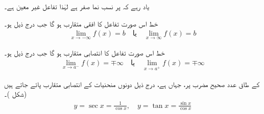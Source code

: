 یاد رہے کہ  پر نسب نما صفر ہے لہٰذا تفاعل غیر معین ہے۔

خط  اس صورت تفاعل  کا  افقی متقارب ہو گا جب  درج ذیل ہو۔
\begin{align*}
 \lim_{x\to -\infty} f(x)=b\quad \text{یا}\quad \lim_{x\to \infty} f(x)=b
\end{align*}

 خط  اس صورت تفاعل  کا انتصابی متقارب ہو گا جب  درج ذیل ہو۔
\begin{align*}
\lim_{x\to a^-} f(x)=\mp \infty\quad \text{یا}\quad \lim_{x\to a^+} f(x)=\mp \infty
\end{align*}

 کے طاق عدد صحیح مضرب پر، جہاں  ہے، درج ذیل دونوں منحنیات کے انتصابی متقارب  پائے جاتے ہیں (شکل )۔
\begin{align*}
y=\sec x=\frac{1}{\cos x},\quad y=\tan x=\frac{\sin x}{\cos x}
\end{align*}

